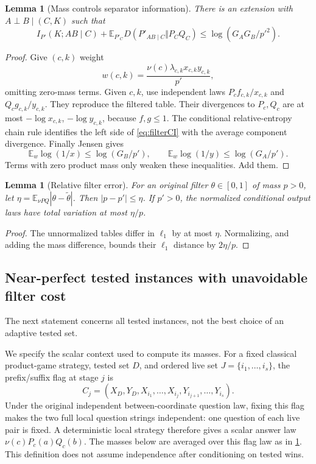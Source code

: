 \documentclass[11pt,reqno]{amsart}
\numberwithin{equation}{section}
\newtheorem{lemma}[theorem]{Lemma}
\theoremstyle{definition}
\theoremstyle{remark}
\newcommand{\E}{\mathbb E}
\begin{document}
\begin{lemma}[Mass controls separator information]\label{lem:filterCI}
There is an extension with \(A\perp B\mid(C,K)\) such that
\begin{equation}\label{eq:filterCI}
 I_{P'}(K;AB\mid C)
 +\E_{P'_C}D(P'_{AB\mid C}\Vert P_CQ_C)
 \le\log(G_AG_B/p'^2).
\end{equation}
\end{lemma}
\begin{proof}
Give \((c,k)\) weight
\[
 w(c,k)=\frac{\nu(c)\lambda_{c,k}x_{c,k}y_{c,k}}{p'},
\]
omitting zero-mass terms. Given \(c,k\), use independent laws
\(P_cf_{c,k}/x_{c,k}\) and \(Q_cg_{c,k}/y_{c,k}\).
They reproduce the filtered table. Their divergences to \(P_c,Q_c\) are at most \(-\log x_{c,k}\), \(-\log y_{c,k}\), because \(f,g\le1\). The conditional relative-entropy chain rule identifies the left side of \eqref{eq:filterCI} with the average component divergence. Finally Jensen gives
\[
 \E_w\log(1/x)\le\log(G_B/p'),\qquad
 \E_w\log(1/y)\le\log(G_A/p').
\]
Terms with zero product mass only weaken these inequalities. Add them.
\end{proof}

\begin{lemma}[Relative filter error]\label{lem:filtererror}
For an original filter \(\theta\in[0,1]\) of mass \(p>0\), let
\(\eta=\E_{\nu P Q}|\theta-\widetilde\theta|\).
Then \(|p-p'|\le\eta\). If \(p'>0\), the normalized conditional output laws have total variation at most \(\eta/p\).
\end{lemma}
\begin{proof}
The unnormalized tables differ in \(\ell_1\) by at most \(\eta\). Normalizing, and adding the mass difference, bounds their \(\ell_1\) distance by \(2\eta/p\).
\end{proof}

\subsection{Near-perfect tested instances with unavoidable filter cost}
The next statement concerns all tested instances, not the best choice of an adaptive tested set.

We specify the scalar context used to compute its masses. For a fixed classical product-game strategy, tested set \(D\), and ordered live set \(J=\{i_1,\ldots,i_s\}\), the prefix/suffix flag at stage \(j\) is
\[
 C_j=(X_D,Y_D,X_{i_1},\ldots,X_{i_j},
                         Y_{i_{j+1}},\ldots,Y_{i_s}).
\]
Under the original independent between-coordinate question law, fixing this flag makes the two full local question strings independent: one question of each live pair is fixed. A deterministic local strategy therefore gives a scalar answer law \(\nu(c)P_c(a)Q_c(b)\). The masses below are averaged over this flag law as in \cref{lem:filterCI}. This definition does not assume independence after conditioning on tested wins.
\end{document}
